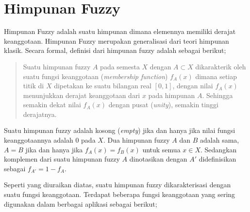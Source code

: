 \section{Himpunan Fuzzy}

Himpunan Fuzzy adalah suatu himpunan dimana elemennya memiliki derajat
keanggotaan. Himpunan Fuzzy merupakan generalisasi dari teori himpunan 
klasik. Secara formal, definisi dari himpunan fuzzy adalah sebagai berikut;

\begin{quotation}
	Suatu himpunan fuzzy $A$ pada semesta $X$ dengan $A \subset X$ dikarakterik
	oleh suatu fungsi keanggotaan (\emph{membership function}) $f_A(x)$  dimana
	setiap titik di $X$ dipetakan ke suatu bilangan real $[0,1]$, dengan nilai
	$f_A(x)$ menunjukkan derajat keanggotaan dari $x$ pada himpunan $A$. Sehingga
	semakin dekat nilai $f_A(x)$ dengan pusat (\emph{unity}), semakin tinggi
	derajatnya.
	\cite{Zadeh:1965}
\end{quotation}
  
Suatu himpunan fuzzy adalah kosong (\emph{empty}) jika dan hanya jika nilai
fungsi keanggotaannya adalah 0 pada $X$. Dua himpunan fuzzy $A$ dan $B$ adalah
sama, $A = B$ jika dan hanya jika $f_A(x) = f_B(x)$ untuk semua $x \in X$.
Sedangkan komplemen dari suatu himpunan fuzzy $A$ dinotasikan dengan $A'$
didefinisikan sebagai $f_{A'} = 1 - f_A$.

Seperti yang diuraikan diatas, suatu himpunan fuzzy dikarakterisasi dengan suatu
fungsi keanggotaan. Terdapat beberapa fungsi keanggotaan yang sering digunakan
dalam berbagai aplikasi sebagai berikut;

